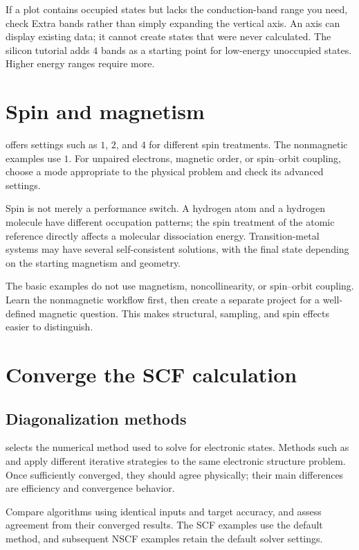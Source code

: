 If a plot contains occupied states but lacks the conduction-band range you need, check Extra bands rather than simply expanding the vertical axis. An axis can display existing data; it cannot create states that were never calculated. The silicon tutorial adds $4$ bands as a starting point for low-energy unoccupied states. Higher energy ranges require more.

\section{Spin and magnetism}

 offers settings such as $1$, $2$, and $4$ for different spin treatments. The nonmagnetic examples use $1$. For unpaired electrons, magnetic order, or spin--orbit coupling, choose a mode appropriate to the physical problem and check its advanced settings.

Spin is not merely a performance switch. A hydrogen atom and a hydrogen molecule have different occupation patterns; the spin treatment of the atomic reference directly affects a molecular dissociation energy. Transition-metal systems may have several self-consistent solutions, with the final state depending on the starting magnetism and geometry.

The basic examples do not use magnetism, noncollinearity, or spin--orbit coupling. Learn the nonmagnetic workflow first, then create a separate project for a well-defined magnetic question. This makes structural, sampling, and spin effects easier to distinguish.

\section{Converge the SCF calculation}

\subsection{Diagonalization methods}

 selects the numerical method used to solve for electronic states. Methods such as  and  apply different iterative strategies to the same electronic structure problem. Once sufficiently converged, they should agree physically; their main differences are efficiency and convergence behavior.

Compare algorithms using identical inputs and target accuracy, and assess agreement from their converged results. The SCF examples use the default method, and subsequent NSCF examples retain the default solver settings.

